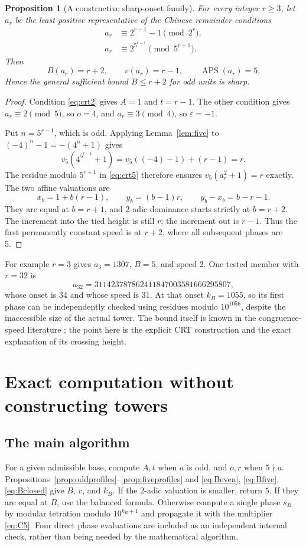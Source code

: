 \documentclass[11pt,letterpaper]{article}
\numberwithin{equation}{section}
\newtheorem{proposition}[theorem]{Proposition}
\theoremstyle{definition}
\newcommand{\APS}{\operatorname{APS}}
\begin{document}
\begin{proposition}[A constructive sharp-onset family]\label{prop:sharp}
For every integer $r\geq3$, let $a_r$ be the least positive representative of the
Chinese remainder conditions
\begin{align}
 a_r&\equiv2^{r-1}-1\pmod {2^r},\label{eq:crt2}\\
 a_r&\equiv2^{5^{r-1}}\pmod {5^{r+1}}.\label{eq:crt5}
\end{align}
Then
\begin{equation}\label{eq:sharp}
 B(a_r)=r+2,\qquad v(a_r)=r-1,\qquad \APS(a_r)=5.
\end{equation}
Hence the general sufficient bound $B\leq r+2$ for odd units is sharp.
\end{proposition}
\begin{proof}
Condition \eqref{eq:crt2} gives $A=1$ and $t=r-1$. The other condition gives
$a_r\equiv2\pmod5$, so $o=4$, and $a_r\equiv3\pmod4$, so
$\varepsilon=-1$.

Put $n=5^{r-1}$, which is odd. Applying Lemma~\ref{lem:five} to
$(-4)^n-1=-(4^n+1)$ gives
\[
 v_5(4^{5^{r-1}}+1)=v_5((-4)-1)+(r-1)=r.
\]
The residue modulo $5^{r+1}$ in \eqref{eq:crt5} therefore ensures
$v_5(a_r^2+1)=r$ exactly. The two affine valuations are
\[
 x_b=1+b(r-1),\qquad y_b=(b-1)r,
 \qquad y_b-x_b=b-r-1.
\]
They are equal at $b=r+1$, and 2-adic dominance starts strictly at $b=r+2$.
The increment into the tied height is still $r$; the increment out is $r-1$.
Thus the first permanently constant speed is at $r+2$, where all subsequent
phases are 5.
\end{proof}

For example $r=3$ gives $a_3=1307$, $B=5$, and speed 2. One tested member
with $r=32$ is
\[
 a_{32}=311423787862411847003581666295807,
\]
whose onset is 34 and whose speed is 31. At that onset $k_B=1055$, so its first
phase can be independently checked using residues modulo $10^{1056}$, despite
the inaccessible size of the actual tower. The bound itself is known in the
congruence-speed literature \cite{ripaonnis}; the point here is the explicit
CRT construction and the exact explanation of its crossing height.

\section{Exact computation without constructing towers}\label{sec:algorithm}

\subsection{The main algorithm}
For a given admissible base, compute $A,t$ when $a$ is odd, and $o,r$ when
$5\nmid a$. Propositions~\ref{prop:oddprofiles}--\ref{prop:fiveprofiles} and
\eqref{eq:Beven}, \eqref{eq:Bfive}, \eqref{eq:Bclosed} give $B$, $v$, and $k_B$.
If the 2-adic valuation is smaller, return $5$. If they are equal at $B$, use
the balanced formula. Otherwise compute a single phase $s_B$ by modular
tetration modulo $10^{k_B+1}$ and propagate it with the multiplier
\eqref{eq:C5}. Four direct phase evaluations are included as an independent
internal check, rather than being needed by the mathematical algorithm.
\end{document}
